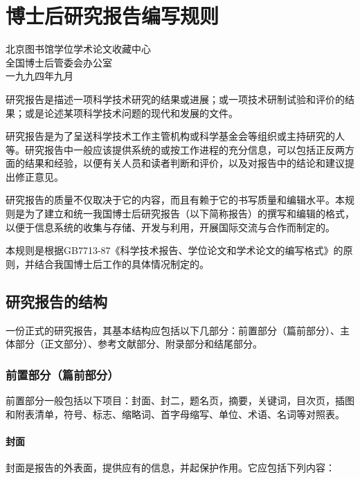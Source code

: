 
\chapter{博士后研究报告编写规则}
\label{chap:requires}


\begin{center}
北京图书馆学位学术论文收藏中心 \\
全国博士后管委会办公室 \\
一九九四年九月
\end{center}


研究报告是描述一项科学技术研究的结果或进展；或一项技术研制试验和评价的结果；或是论述某项科学技术问题的现代和发展的文件。

研究报告是为了呈送科学技术工作主管机构或科学基金会等组织或主持研究的人等。研究报告中一般应该提供系统的或按工作进程的充分信息，可以包括正反两方面的结果和经验，以便有关人员和读者判断和评价，以及对报告中的结论和建议提出修正意见。

研究报告的质量不仅取决于它的内容，而且有赖于它的书写质量和编辑水平。本规则是为了建立和统一我国博士后研究报告（以下简称报告）的撰写和编辑的格式，以便于信息系统的收集与存储、开发与利用，开展国际交流与合作而制定的。

本规则是根据GB7713-87《科学技术报告、学位论文和学术论文的编写格式》的原则，并结合我国博士后工作的具体情况制定的。


\section{研究报告的结构}

一份正式的研究报告，其基本结构应包括以下几部分：前置部分（篇前部分）、主体部分（正文部分）、参考文献部分、附录部分和结尾部分。


\subsection{前置部分（篇前部分）}

前置部分一般包括以下项目：封面、封二，题名页，摘要，关键词，目次页，插图和附表清单，符号、标志、缩略词、首字母缩写、单位、术语、名词等对照表。


\subsubsection{封面}

封面是报告的外表面，提供应有的信息，并起保护作用。它应包括下列内容：

